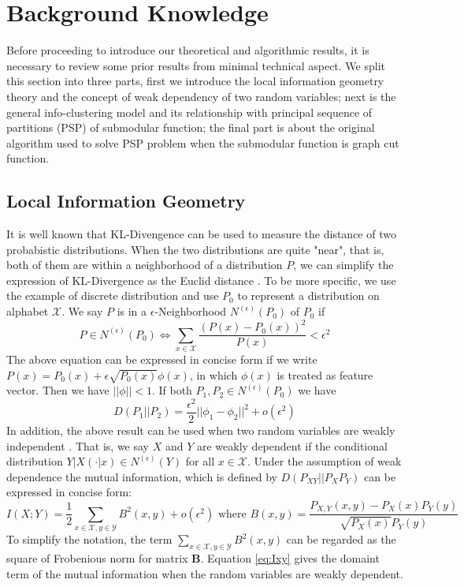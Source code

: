 \section{Background Knowledge}\label{sec:bk}
Before proceeding to introduce our theoretical and algorithmic results, it is necessary to review some prior results from minimal technical aspect. We split this section into three parts, first we introduce
the local information geometry theory and the concept of weak dependency of two random variables;
next is the general info-clustering model and its relationship with principal sequence of partitions (PSP) of submodular function;
the final part is about the original algorithm used to solve PSP problem when the submodular function
is graph cut function.
\subsection{Local Information Geometry}
It is well known that KL-Divengence can be used to measure the distance of two probabistic distributions. When the two distributions are quite "near", that is, both of them are within a neighborhood of a distribution $P$, we can simplify the expression of KL-Divergence as the Euclid distance \citep{huang2017information}. To be more specific, we use the example of discrete distribution and use $P_0$ to represent a distribution on alphabet $\mathcal{X}$. We say $P$ is in a $\epsilon$-Neighborhood $N^{(\epsilon)}(P_0)$ of $P_0$ if
\begin{equation}
P \in N^{(\epsilon)}(P_0) \iff \sum_{x \in \mathcal{X}} \frac{(P(x) - P_0(x))^2}{P(x)} < \epsilon^2
\end{equation}
The above equation can be expressed in concise form if we write $P(x) = P_0(x) + \epsilon
\sqrt{P_0(x)} \phi(x)$, in which $\phi(x)$ is treated as feature vector. Then we have $||\phi || < 1$.
If both $P_1, P_2 \in N^{(\epsilon)}(P_0)$ we have
\begin{equation}
D(P_1 || P_2) = \frac{\epsilon^2}{2} ||\phi_1 - \phi_2||^2 + o(\epsilon^2)
\end{equation}
In addition, the above result can be used when two random variables are weakly independent \citep{huang2019universal}. That is, we say $X$ and $Y$ are weakly dependent if the conditional distribution $Y|X(\cdot |x) \in N^{(\epsilon)}(Y)$ for all $x \in \mathcal{X}$. Under the assumption of
weak dependence the mutual information, which is defined by $D(P_{XY}||P_XP_Y)$ can be expressed
in concise form:
\begin{equation}\label{eq:Ixy}
I(X;Y) = \frac{1}{2}\sum_{x\in \mathcal{X}, y\in \mathcal{Y}} B^2(x,y) + o(\epsilon^2) \textrm{ where }  B(x,y)=\frac{P_{X,Y}(x,y) - P_X(x) P_Y(y)}{\sqrt{P_X(x)}{P_Y(y)}}
\end{equation}
To simplify the notation, the term $\sum_{x\in \mathcal{X}, y\in \mathcal{Y}} B^2(x,y)$ can be regarded as the square of Frobenious norm for matrix $\bm{B}$. Equation \eqref{eq:Ixy} gives the domaint term
of the mutual information when the random variables are weakly dependent.

